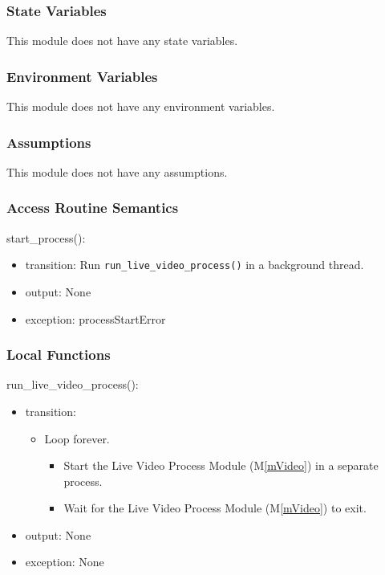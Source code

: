 \documentclass[12pt, titlepage]{article}
\newcommand{\mref}[1]{M\ref{#1}}
\begin{document}
\subsubsection{State Variables}

This module does not have any state variables.

\subsubsection{Environment Variables}

This module does not have any environment variables.

\subsubsection{Assumptions}

This module does not have any assumptions.

\subsubsection{Access Routine Semantics}

\noindent start\_process():
\begin{itemize}
  \item transition: Run \texttt{run\_live\_video\_process()} in a background thread.
  \item output: None
  \item exception: processStartError
\end{itemize}

\subsubsection{Local Functions}

\noindent run\_live\_video\_process():
\begin{itemize}
  \item transition:
        \begin{itemize}
          \item Loop forever.
                \begin{itemize}
                  \item Start the Live Video Process Module (\mref{mVideo}) in a separate process.
                  \item Wait for the Live Video Process Module (\mref{mVideo}) to exit.
                \end{itemize}
        \end{itemize}
  \item output: None
  \item exception: None
\end{itemize}
\end{document}
